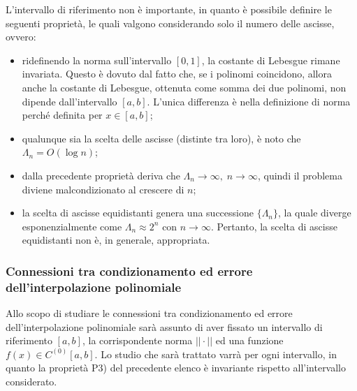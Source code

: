 \addtocounter{footnote}{-2}



L'intervallo di riferimento non è importante, in quanto è possibile definire le seguenti proprietà, le quali valgono considerando solo il numero delle ascisse, ovvero:

\begin{property}[di $\Lambda_n$]
	\begin{itemize}
		\item [P1)] ridefinendo la norma sull'intervallo $[0,1]$, la costante di Lebesgue rimane invariata. Questo è dovuto dal fatto che, se i polinomi coincidono, allora anche la costante di Lebesgue, ottenuta come somma dei due polinomi, non dipende dall'intervallo $[a,b]$. L'unica differenza è nella definizione di norma perché definita per $x\in[a,b]$;
		\item [P2)] qualunque sia la scelta delle ascisse (distinte tra loro), è noto che $\Lambda_n = O(\log n)$;
		\item[P3)] dalla precedente proprietà deriva che $\Lambda_n\rightarrow\infty,\; n\rightarrow\infty$, quindi il problema diviene malcondizionato al crescere di $n$;
		\item[P4)] la scelta di ascisse equidistanti genera una successione $\{\Lambda_n\}$, la quale diverge esponenzialmente come $\Lambda_n\approx 2^n$ con $n\rightarrow\infty$. Pertanto, la scelta di ascisse equidistanti non è, in generale, appropriata.
	\end{itemize}
\end{property}

\subsubsection{Connessioni tra condizionamento ed errore dell'interpolazione polinomiale}
\footnotemark Allo scopo di studiare le connessioni tra condizionamento ed errore dell'interpolazione polinomiale sarà assunto di aver fissato un intervallo di riferimento $[a,b]$, la corrispondente norma $||\cdot||$ ed una funzione $f(x)\in C^{(0)}[a,b]$. Lo studio che sarà trattato varrà per ogni intervallo, in quanto la proprietà P3) del precedente elenco è invariante rispetto all'intervallo considerato.

